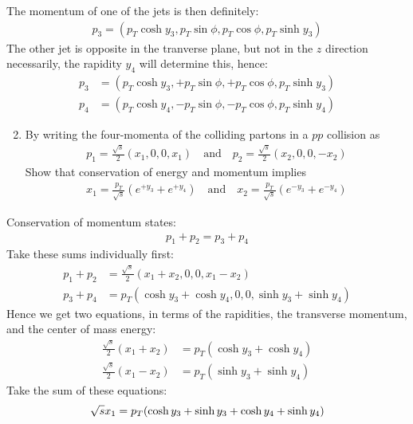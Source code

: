 \documentclass[12pt]{article}
\begin{document}
The momentum of one of the jets is then definitely:
\begin{align*}
  p_3=(p_T\cosh y_3,p_T\sin\phi,p_T\cos\phi,p_T\sinh y_3)
\end{align*}
The other jet is opposite in the tranverse plane, but not in the $z$ direction necessarily, the rapidity $y_4$ will determine this, hence:
\begin{equation}
  \label{eq:p8a}
  \boxed{
    \begin{aligned}
      p_3&=(p_T\cosh y_3,+p_T\sin\phi,+p_T\cos\phi,p_T\sinh y_3)\\
      p_4&=(p_T\cosh y_4,-p_T\sin\phi,-p_T\cos\phi,p_T\sinh y_4)
    \end{aligned}
  }
\end{equation}
\begin{problem}
  \begin{enumerate}[label = (\alph*)]
    \setcounter{enumi}{1}
  \item By writing the four-momenta of the colliding partons in a $pp$ collision as
    \begin{align*}
      p_1=\frac{\sqrt{s}}{2}(x_1,0,0,x_1)
      \quad\text{and}\quad
      p_2=\frac{\sqrt{s}}{2}(x_2,0,0,-x_2)
    \end{align*}
    Show that conservation of energy and momentum implies
    \begin{align*}
      x_1=\frac{p_T}{\sqrt{s}}(e^{+y_3}+e^{+y_4})
      \quad\text{and}\quad
      x_2=\frac{p_T}{\sqrt{s}}(e^{-y_3}+e^{-y_4})
    \end{align*}
  \end{enumerate}
\end{problem}
Conservation of momentum states:
\begin{align*}
  p_1+p_2=p_3+p_4
\end{align*}
Take these sums individually first:
\begin{align*}
  p_1+p_2&=\frac{\sqrt{s}}2(x_1+x_2,0,0,x_1-x_2)\\
  p_3+p_4&=p_T(\cosh y_3+\cosh y_4,0,0,\sinh y_3+\sinh y_4)
\end{align*}
Hence we get two equations, in terms of the rapidities, the transverse momentum, and the center of mass energy:
\begin{align*}
  \frac{\sqrt{s}}2(x_1+x_2)&=p_T(\cosh y_3+\cosh y_4)\\
  \frac{\sqrt{s}}2(x_1-x_2)&=p_T(\sinh y_3+\sinh y_4)
\end{align*}
Take the sum of these equations:
\begin{align*}
  \sqrt{s}x_1=p_T\qty(\cosh y_3+\sinh y_3+\cosh y_4+\sinh y_4)
\end{align*}
\end{document}
